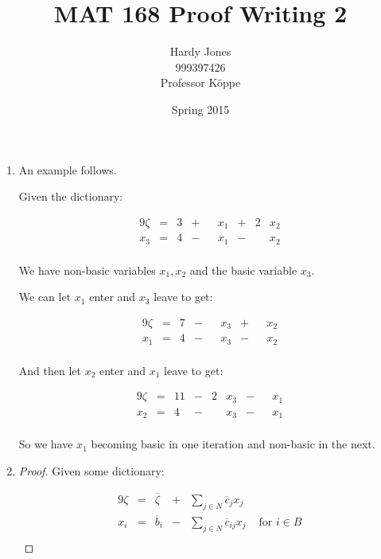 \documentclass[12pt,letterpaper]{article}
\title{MAT 168 Proof Writing 2\vspace{-2ex}}
\author{Hardy Jones\\
        999397426\\
        Professor K\"{o}ppe\vspace{-2ex}}
\date{Spring 2015}
\begin{document}
  \maketitle

  \begin{enumerate}
    \item
      An example follows.

      Given the dictionary:

      \begin{alignat*}{9}
        \zeta  & {}={} & 3 & {}+{} &   & x_1 & {}+{} & 2 & x_2 \\
        x_3    & {}={} & 4 & {}-{} &   & x_1 & {}-{} &   & x_2 \\
      \end{alignat*}

      We have non-basic variables $x_1, x_2$ and the basic variable $x_3$.

      We can let $x_1$ enter and $x_3$ leave to get:

      \begin{alignat*}{9}
        \zeta  & {}={} & 7 & {}-{} &   & x_3 & {}+{} &   & x_2 \\
        x_1    & {}={} & 4 & {}-{} &   & x_3 & {}-{} &   & x_2 \\
      \end{alignat*}

      And then let $x_2$ enter and $x_1$ leave to get:

      \begin{alignat*}{9}
        \zeta  & {}={} & 11 & {}-{} & 2 & x_3 & {}-{} &   & x_1 \\
        x_2    & {}={} & 4  & {}-{} &   & x_3 & {}-{} &   & x_1 \\
      \end{alignat*}

      So we have $x_1$ becoming basic in one iteration and non-basic in the next.
    \item
      \begin{proof}
        Given some dictionary:

        \begin{alignat*}{9}
          \zeta  & {}={} & \overline{\zeta} & {}+{} & \sum_{j \in N} \overline{c}_jx_j    &         \\
          x_i    & {}={} & \overline{b}_i   & {}-{} & \sum_{j \in N} \overline{c}_{ij}x_j & \text{ for } i \in B \\
        \end{alignat*}


\end{proof}
\end{enumerate}
\end{document}
